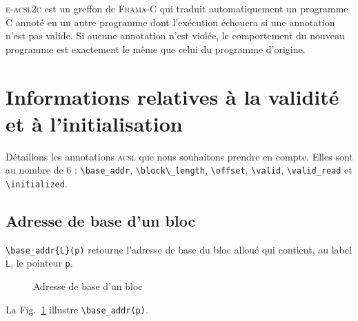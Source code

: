\documentclass[french]{spimufcphdthesis}
\begin{document}
\textsc{e-acsl2c} est un greffon de \textsc{Frama-C} qui traduit automatiquement
un programme C annoté en un autre programme dont l'exécution échouera si une
annotation n'est pas valide. Si aucune annotation n'est violée, le comportement
du nouveau programme est exactement le même que celui du programme d'origine.




\section{Informations relatives à la validité et à l'initialisation}


Détaillons les annotations \textsc{acsl} que nous souhaitons prendre en compte.
Elles sont au nombre de 6 : \lstinline{\base_addr}, \lstinline{\block\_length},
\lstinline{\offset}, \lstinline{\valid}, \lstinline{\valid_read} et
\lstinline{\initialized}.

\subsection{Adresse de base d'un bloc}

\lstinline'\base_addr{L}(p)' retourne l'adresse de base du bloc alloué
qui contient, au label \lstinline{L}, le pointeur \lstinline{p}.

\begin{figure}[h]
  \begin{center}
  \end{center}
  \caption{Adresse de base d'un bloc}
  \label{fig:base-addr}
\end{figure}

La Fig.~\ref{fig:base-addr} illustre \lstinline{\base_addr(p)}.
\end{document}
